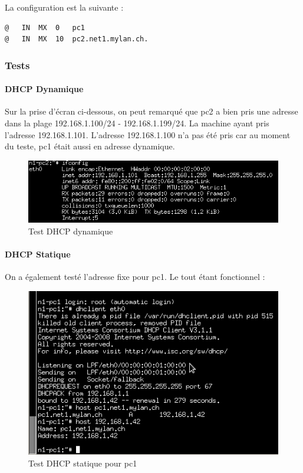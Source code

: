 \documentclass{article}
\begin{document}
La configuration est la suivante : 

\begin{lstlisting}
@	IN	MX	0	pc1
@	IN	MX	10	pc2.net1.mylan.ch.
\end{lstlisting}

\subsubsection{Tests}

\paragraph{DHCP Dynamique}

Sur la prise d'écran ci-dessous, on peut remarqué que pc2 a bien pris une adresse dans la plage 192.168.1.100/24 - 192.168.1.199/24. La machine ayant pris l'adresse 192.168.1.101. L'adresse 192.168.1.100 n'a pas été pris car au moment du teste, pc1 était aussi en adresse dynamique.

\begin{figure}[!ht]
	\centering
	\includegraphics{./captures/testpc2-dhcp.png}
	\caption{Test DHCP dynamique}
	\label{fig:Test DHCP dynamiqu}
\end{figure}

\paragraph{DHCP Statique}

On a également testé l'adresse fixe pour pc1. Le tout étant fonctionnel :

\begin{figure}[!ht]
	\centering
	\includegraphics{./captures/7-testfixadress.png}
	\caption{Test DHCP statique pour pc1}
	\label{fig:Test DHCP statique pour pc1}
\end{figure}
\end{document}
